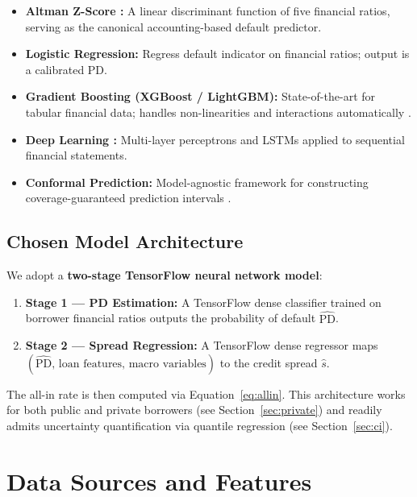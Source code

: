 \documentclass[12pt, a4paper]{article}
\theoremstyle{definition}
\begin{document}
\begin{itemize}[leftmargin=*]
  \item \textbf{Altman Z-Score \citep{altman1968financial}:}
    A linear discriminant function of five financial ratios, serving as the
    canonical accounting-based default predictor.
  \item \textbf{Logistic Regression:}
    Regress default indicator on financial ratios; output is a calibrated PD.
  \item \textbf{Gradient Boosting (XGBoost / LightGBM):}
    State-of-the-art for tabular financial data; handles non-linearities and
    interactions automatically \citep{chen2016xgboost}.
  \item \textbf{Deep Learning \citep{mai2019deep}:}
    Multi-layer perceptrons and LSTMs applied to sequential financial statements.
  \item \textbf{Conformal Prediction:}
    Model-agnostic framework for constructing coverage-guaranteed prediction
    intervals \citep{angelopoulos2023conformal}.
\end{itemize}

\subsection{Chosen Model Architecture}
\label{sec:architecture}

We adopt a \textbf{two-stage TensorFlow neural network model}:

\begin{enumerate}
  \item \textbf{Stage 1 --- PD Estimation:} A TensorFlow dense classifier trained on borrower
    financial ratios outputs the probability of default $\widehat{\text{PD}}$.
  \item \textbf{Stage 2 --- Spread Regression:} A TensorFlow dense regressor maps
    $(\widehat{\text{PD}},\,\text{loan features},\,\text{macro variables})$ to the
    credit spread $\hat{s}$.
\end{enumerate}

The all-in rate is then computed via Equation~\eqref{eq:allin}.
This architecture works for both public and private borrowers (see Section~\ref{sec:private})
and readily admits uncertainty quantification via quantile regression
(see Section~\ref{sec:ci}).

\section{Data Sources and Features}
\label{sec:data}
\end{document}
